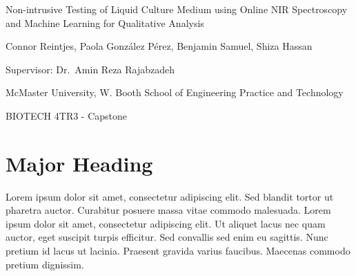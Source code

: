 \documentclass[12pt]{article}
\renewcommand{\cite}{\supercite}
\newcommand\titleofdoc{Non-intrusive Testing of Liquid Culture Medium using Online NIR Spectroscopy and Machine Learning for Qualitative Analysis} %
\begin{document}
\begin{titlepage}
   \begin{center}
        \vspace*{2.5cm} %

        \LARGE{\titleofdoc} 

        \vspace{0.5cm}
            
        \vspace{3cm}
       
        \vspace{0.25cm}
        \large{Connor Reintjes, Paola Gonz\'alez P\'erez, Benjamin Samuel, Shiza Hassan}

        \vspace{0.25cm}
        \large{Supervisor: Dr.~Amin Reza Rajabzadeh}
       
        \vspace{3 cm}
        \large{McMaster University, W. Booth School of Engineering Practice and Technology}
        
        \vspace{0.25 cm}
        \large{BIOTECH 4TR3 - Capstone}
       

       \vfill
    \end{center}
\end{titlepage}

\setcounter{page}{2}
\pagestyle{fancy}
\fancyhf{}
\rhead{\thepage}

\section*{Major Heading} %

Lorem ipsum dolor sit amet, consectetur adipiscing elit. Sed blandit tortor ut pharetra auctor. Curabitur posuere massa vitae commodo malesuada. Lorem ipsum dolor sit amet, consectetur adipiscing elit. Ut aliquet lacus nec quam auctor, eget suscipit turpis efficitur. Sed convallis sed enim eu sagittis. Nunc pretium id lacus ut lacinia. Praesent gravida varius faucibus. Maecenas commodo pretium dignissim\cite{cohen_quantifying_2020}. 
\end{document}
